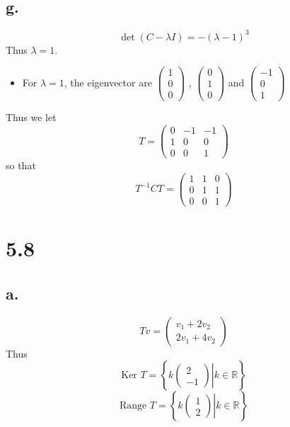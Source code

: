 \documentclass[11pt]{article}
\theoremstyle{mystyle}
\theoremstyle{definition}
\begin{document}
\subsection*{g.}
\[
  \det(C - \lambda I) = -(\lambda-1)^3
\]
Thus $\lambda =1$. 
\begin{itemize}
  \item For $\lambda = 1$, the eigenvector are 
    $\begin{pmatrix}
      1 \\ 0 \\ 0 
    \end{pmatrix}$
    ,
    $\begin{pmatrix}
    0 \\ 1 \\ 0 
    \end{pmatrix}$
    and 
    $\begin{pmatrix}
    -1 \\ 0 \\ 1 
    \end{pmatrix}$
\end{itemize}
Thus we let 
\[
  T = 
  \begin{pmatrix}
    0 & -1 & -1 \\
    1 & 0 & 0 \\
    0 & 0 & 1
  \end{pmatrix}
\]
so that 
\[
  T^{-1} C T = 
  \begin{pmatrix}
    1 & 1 & 0 \\
    0 & 1 & 1 \\
    0 & 0 & 1
  \end{pmatrix}
\]
\section*{5.8}
\subsection*{a.}
\[
  Tv = 
  \begin{pmatrix}
    v_1 + 2v_2 \\
    2v_1 + 4v_2
  \end{pmatrix}
\]
Thus 
\[
  \text{Ker } T = 
  \left\{
    \left. k
    \begin{pmatrix}
    2 \\
    -1
    \end{pmatrix}
    \right| k \in \mathbb{R}
    \right\}
\]
\[
  \text{Range } T = 
  \left\{
    \left. k
    \begin{pmatrix}
    1 \\
    2
    \end{pmatrix}
    \right| k \in \mathbb{R}
  \right\}
\]
\end{document}
